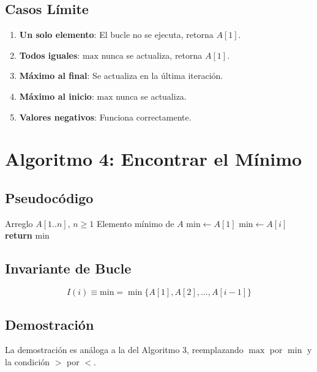 \documentclass[11pt,a4paper]{article}
\newcommand{\inv}{I}
\begin{document}
\subsection{Casos Límite}
\begin{enumerate}
    \item \textbf{Un solo elemento}: El bucle no se ejecuta, retorna $A[1]$.
    \item \textbf{Todos iguales}: $\text{max}$ nunca se actualiza, retorna $A[1]$.
    \item \textbf{Máximo al final}: Se actualiza en la última iteración.
    \item \textbf{Máximo al inicio}: $\text{max}$ nunca se actualiza.
    \item \textbf{Valores negativos}: Funciona correctamente.
\end{enumerate}

\newpage

\section{Algoritmo 4: Encontrar el Mínimo}

\subsection{Pseudocódigo}
\begin{algorithm}[H]
\caption{Encontrar el Mínimo}
\begin{algorithmic}[1]
\Require Arreglo $A[1..n]$, $n \geq 1$
\Ensure Elemento mínimo de $A$
\State $\text{min} \gets A[1]$
        \State $\text{min} \gets A[i]$
    \EndIf
\EndFor
\State \textbf{return} $\text{min}$
\end{algorithmic}
\end{algorithm}

\subsection{Invariante de Bucle}
\[
\boxed{\inv(i) \equiv \text{min} = \min\{A[1], A[2], \ldots, A[i-1]\}}
\]

\subsection{Demostración}
La demostración es análoga a la del Algoritmo 3, reemplazando $\max$ por $\min$ y la condición $>$ por $<$.
\end{document}
